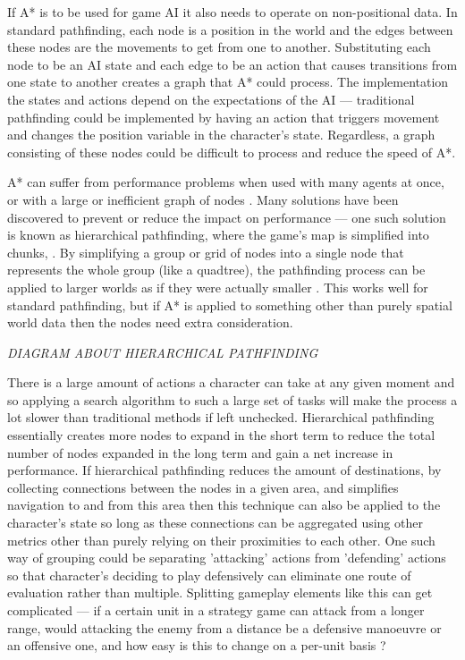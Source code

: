 \documentclass[11pt, a4paper]{article}
\begin{document}
If A* is to be used for game AI it also needs to operate on non-positional data. In standard pathfinding, each node is a position in the world and the edges between these nodes are the movements to get from one to another. Substituting each node to be an AI state and each edge to be an action that causes transitions from one state to another creates a graph that A* could process. The implementation the states and actions depend on the expectations of the AI --- traditional pathfinding could be implemented by having an action that triggers movement and changes the position variable in the character's state. Regardless, a graph consisting of these nodes could be difficult to process and reduce the speed of A*.

A* can suffer from performance problems when used with many agents at once, or with a large or inefficient graph of nodes \parencite{graham2003pathfinding}. Many solutions have been discovered to prevent or reduce the impact on performance --- one such solution is known as hierarchical pathfinding, where the game's map is simplified into chunks, \parencite[126]{cui2011based}. By simplifying a group or grid of nodes into a single node that represents the whole group (like a quadtree), the pathfinding process can be applied to larger worlds as if they were actually smaller \parencite{botea2004near}. This works well for standard pathfinding, but if A* is applied to something other than purely spatial world data then the nodes need extra consideration. 

\emph{DIAGRAM ABOUT HIERARCHICAL PATHFINDING}

There is a large amount of actions a character can take at any given moment \parencite[62]{nareyek2004ai} and so applying a search algorithm to such a large set of tasks will make the process a lot slower than traditional methods if left unchecked. Hierarchical pathfinding essentially creates more nodes to expand in the short term to reduce the total number of nodes expanded in the long term and gain a net increase in performance. If hierarchical pathfinding reduces the amount of destinations, by collecting connections between the nodes in a given area, and simplifies navigation to and from this area then this technique can also be applied to the character's state so long as these connections can be aggregated using other metrics other than purely relying on their proximities to each other. One such way of grouping  could be separating 'attacking' actions from 'defending' actions so that character's deciding to play defensively can eliminate one route of evaluation rather than multiple. Splitting gameplay elements like this can get complicated --- if a certain unit in a strategy game can attack from a longer range, would attacking the enemy from a distance be a defensive manoeuvre or an offensive one, and how easy is this to change on a per-unit basis \parencite{weber2011building}?
\end{document}

